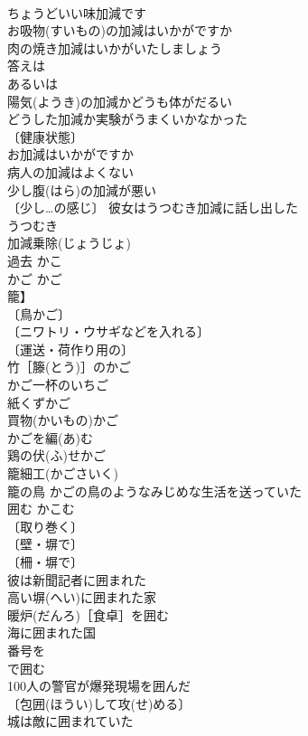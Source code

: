 \documentclass[8pt]{extreport}
\begin{document}
\begin{CJK}{UTF8}{min}
\\	ちょうどいい味加減です 
\\	お吸物(すいもの)の加減はいかがですか 
\\	肉の焼き加減はいかがいたしましょう 
\\	答えは
\\	あるいは
\\	陽気(ようき)の加減かどうも体がだるい 
\\	どうした加減か実験がうまくいかなかった 
\\	〔健康状態〕 
\\	お加減はいかがですか 
\\	病人の加減はよくない 
\\	少し腹(はら)の加減が悪い 
\\	〔少し…の感じ〕 彼女はうつむき加減に話し出した 
\\	うつむき　
\\	加減乗除(じょうじょ) 
\\	過去	かこ	
\\	かご	かご　
\\	籠】	
\\	〔鳥かご〕
\\	〔ニワトリ・ウサギなどを入れる〕
\\	〔運送・荷作り用の〕
\\	竹［籐(とう)］のかご 
\\	かご一杯のいちご 
\\	紙くずかご 
\\	買物(かいもの)かご 
\\	かごを編(あ)む 
\\	鶏の伏(ふ)せかご 
\\	籠細工(かごさいく) 
\\	籠の鳥 かごの鳥のようなみじめな生活を送っていた 
\\	囲む	かこむ	
\\	〔取り巻く〕
\\	〔壁・塀で〕
\\	〔柵・塀で〕
\\	彼は新聞記者に囲まれた 
\\	高い塀(へい)に囲まれた家 
\\	暖炉(だんろ)［食卓］を囲む 
\\	海に囲まれた国 
\\	番号を
\\	で囲む 
\\	100人の警官が爆発現場を囲んだ 
\\	〔包囲(ほうい)して攻(せ)める〕
\\	城は敵に囲まれていた 

\end{CJK}
\end{document}
